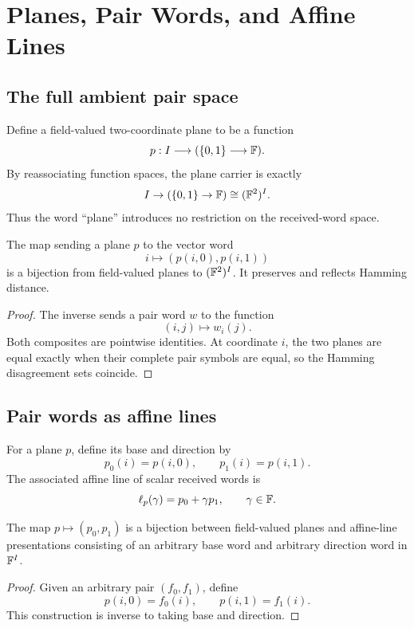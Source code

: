 \section{Planes, Pair Words, and Affine Lines}

\subsection{The full ambient pair space}

Define a field-valued two-coordinate plane to be a function
\[
  p:I\longrightarrow(\{0,1\}\longrightarrow\mathbb{F}).
\]
By reassociating function spaces, the plane carrier is exactly
\[
  I\to(\{0,1\}\to\mathbb{F})
  \cong
  (\mathbb{F}^2)^I.
\]
Thus the word ``plane'' introduces no restriction on the received-word space.

\begin{proposition}
\label{prop:plane-pair-equivalence}
The map sending a plane \(p\) to the vector word
\[
  i\longmapsto(p(i,0),p(i,1))
\]
is a bijection from field-valued planes to \((\mathbb{F}^2)^I\).  It preserves and
reflects Hamming distance.
\end{proposition}

\begin{proof}
The inverse sends a pair word \(w\) to the function
\[
  (i,j)\longmapsto w_i(j).
\]
Both composites are pointwise identities.  At coordinate \(i\), the two planes
are equal exactly when their complete pair symbols are equal, so the Hamming
disagreement sets coincide.
\end{proof}

\subsection{Pair words as affine lines}

For a plane \(p\), define its base and direction by
\[
  p_0(i)=p(i,0),
  \qquad
  p_1(i)=p(i,1).
\]
The associated affine line of scalar received words is
\[
  \ell_p(\gamma)=p_0+\gamma p_1,
  \qquad \gamma\in\mathbb{F}.
\]

\begin{proposition}
\label{prop:plane-line-equivalence}
The map \(p\mapsto(p_0,p_1)\) is a bijection between field-valued planes and
affine-line presentations consisting of an arbitrary base word and arbitrary
direction word in \(\mathbb{F}^I\).
\end{proposition}

\begin{proof}
Given an arbitrary pair \((f_0,f_1)\), define
\[
  p(i,0)=f_0(i),\qquad p(i,1)=f_1(i).
\]
This construction is inverse to taking base and direction.
\end{proof}

